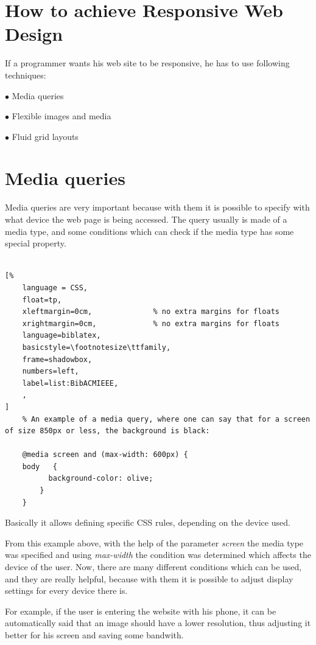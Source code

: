 \section{How to achieve Responsive Web Design}

If a programmer wants his web site to be responsive, he has to use 
following techniques:

$\bullet$ Media queries 

$\bullet$ Flexible images and media

$\bullet$ Fluid grid layouts



\section{Media queries}

Media queries are very important because with them it is possible to specify 
with what device the web page is being accessed. The query usually is made of
a media type, and some conditions which can check if the media type has some special
property.
\\
\\
\begin{lstlisting}[%
    language = CSS, 
    float=tp,
    xleftmargin=0cm,              % no extra margins for floats
    xrightmargin=0cm,             % no extra margins for floats
    language=biblatex,
    basicstyle=\footnotesize\ttfamily,
    frame=shadowbox,
    numbers=left,
    label=list:BibACMIEEE,
    ,
]
    % An example of a media query, where one can say that for a screen of size 850px or less, the background is black:

    @media screen and (max-width: 600px) {
    body   {
          background-color: olive;
        }
    }
\end{lstlisting}
Basically it allows defining specific CSS rules, depending on the device used.

From this example above, with the help of the parameter \emph{screen}
the media type was specified and using \emph{max-width} the condition was determined which
affects the device of the user. Now, there are many different conditions which
can be used, and they are really helpful, because with them it is possible to adjust 
display settings for every device there is. 

For example, if the user is entering the website with his phone, it can be automatically said that an image should have a lower resolution,
thus adjusting it better for his screen and saving some bandwith.

